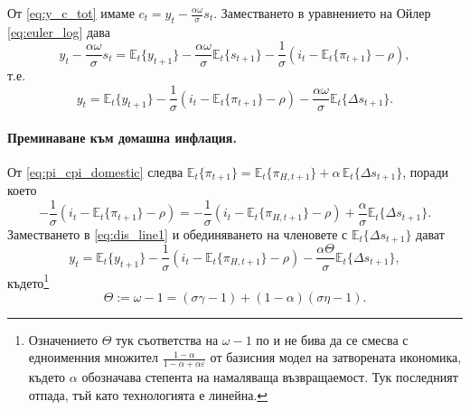 От \eqref{eq:y_c_tot} имаме $c_t = y_t - \frac{\alpha\omega}{\sigma}s_t$. Заместването в уравнението на Ойлер \eqref{eq:euler_log} дава
\begin{equation}
y_t - \frac{\alpha\omega}{\sigma}s_t
= \mathbb{E}_t\{y_{t+1}\} - \frac{\alpha\omega}{\sigma}\mathbb{E}_t\{s_{t+1}\}
- \frac{1}{\sigma}\left( i_t - \mathbb{E}_t\{\pi_{t+1}\} - \rho \right),
\label{eq:dis_step1}
\end{equation}
т.е.
\begin{equation}
y_t = \mathbb{E}_t\{ y_{t+1} \} - \frac{1}{\sigma} \left( i_t - \mathbb{E}_t\{\pi_{t+1}\} - \rho \right)
- \frac{\alpha\omega}{\sigma} \mathbb{E}_t\{ \Delta s_{t+1} \}.
\label{eq:dis_line1}
\end{equation}

\paragraph{Преминаване към домашна инфлация.}
От \eqref{eq:pi_cpi_domestic} следва $\mathbb{E}_t\{\pi_{t+1}\} = \mathbb{E}_t\{\pi_{H,t+1}\} + \alpha\,\mathbb{E}_t\{\Delta s_{t+1}\}$, поради което
\[
-\frac{1}{\sigma}\left( i_t - \mathbb{E}_t\{\pi_{t+1}\} - \rho \right)
= -\frac{1}{\sigma}\left( i_t - \mathbb{E}_t\{\pi_{H,t+1}\} - \rho \right)
+ \frac{\alpha}{\sigma}\mathbb{E}_t\{\Delta s_{t+1}\}.
\]
Заместването в \eqref{eq:dis_line1} и обединяването на членовете с $\mathbb{E}_t\{\Delta s_{t+1}\}$ дават
\begin{equation}
y_t = \mathbb{E}_t\{ y_{t+1} \} - \frac{1}{\sigma} \left( i_t - \mathbb{E}_t\{\pi_{H,t+1}\} - \rho \right)
- \frac{\alpha\Theta}{\sigma} \mathbb{E}_t\{ \Delta s_{t+1} \},
\label{eq:dis_line2}
\end{equation}
където\footnote{Означението $\Theta$ тук съответства на $\omega-1$ по \textcite[с.~161]{Gali2008} и не бива да се смесва с едноименния множител $\frac{1-\alpha}{1-\alpha+\alpha\varepsilon}$ от базисния модел на затворената икономика, където $\alpha$ обозначава степента на намаляваща възвращаемост. Тук последният отпада, тъй като технологията е линейна.}
\begin{equation}
\Theta := \omega - 1 = (\sigma\gamma - 1) + (1-\alpha)(\sigma\eta - 1).
\label{eq:Theta_def}
\end{equation}

